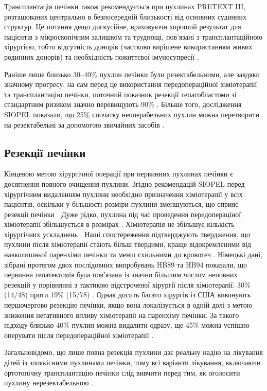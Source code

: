 Трансплантація печінки також рекомендується при пухлинах PRETEXT III, розташованих центрально в безпосередній близькості від основних судинних структур. Це питання дещо дискусійне, враховуючи хороший результат для пацієнтів з мікроскопічним залишком та труднощі, пов’язані з трансплантаційною хірургією, тобто відсутність донорів (частково вирішене використанням живих родинних донорів) та необхідність пожиттєвої імуносупресії \cite{pmid30819543}. 

Раніше лише близько 30–40\% пухлин печінки були резектабельними, але завдяки значному прогресу, на сам перед це використання передопераційної хіміотерапії та трансплантацію печінки, поточний показник резекції гепатобластоми зі стандартним ризиком значно перевищують 90\% \cite{pmid30946509} \cite{pmid31130716}. Більше того, дослідження SIOPEL показали, що 25\% спочатку неоперабельних пухлин можна перетворити на резектабельні за допомогою звичайних засобів \cite{pmid31155201}. 

\subsection{Резекції печінки}
Кінцевою метою хірургічної операції при первинних пухлинах печінки є досягнення повного очищення пухлини. Згідно рекомендацій SIOPEL перед хірургічним видаленням пухлини необхідно призначення хіміотерапії у всіх пацієнтів, оскільки у більшості розміри пухлини зменшуються, що сприяє резекції печінки \cite{pmid31225421}. Дуже рідко, пухлина під час проведення передопераціної хіміотерапії збільшується в розмірах \cite{pmid31262438}. Хіміотерапія не збільшує кількість хірургічних ускладнень \cite{pmid31434361}. Наші спостереження підтверджують твердження, що пухлини після хіміотерапії стають більш твердими, краще відокремленими від навколишньої паренхіми печінки та менш схильними до кровотеч \cite{pmid31584686}. Німецькі дані, зібрані протягом двох послідовних випробувань HB89 та HB94 показали, що первинна гепатектомія була пов'язана із значно більшим числом неповних резекцій у порівнянні з тактикою відстроченої хірургії після хіміотерапії: 30\% (14/48) проти 19\% (15/78) \cite{pmid31645068}. Однак досить багато хірургів із США виконують першочергово резекцію печінки, якщо вона локалізується в одній долі з метою зниження негативного впливу хіміотерапії на паренхіму печінки. За такого підходу близько 40\% пухлин можна видалити одразу, ще 45\% можна успішно оперувати після передопераційної хіміотерапії \cite{pmid31683629}.

Загальновідомо, що лише повна резекція пухлини дає реальну надію на лікування дітей із злоякісними пухлинами печінки, тому всі варіанти лікування, включаючи ортотопічну трансплантацію печінки слід вивчити перед тим, як оголосити пухлину нерезектабельною \cite{pmid31718024}. 

